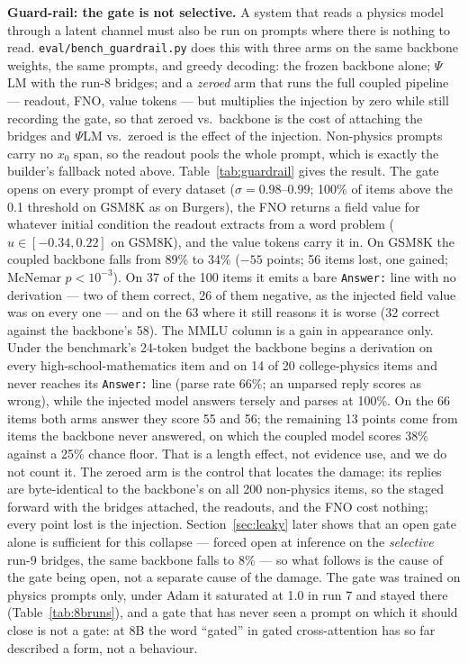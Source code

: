 \documentclass[11pt]{article}
\newcommand{\psilm}{$\Psi$LM}
\newcommand{\code}[1]{\texttt{#1}}
\begin{document}
\textbf{Guard-rail: the gate is not selective.} A system that reads a physics model through a latent channel must also be run on prompts where there is nothing to read. \code{eval/bench\_guardrail.py} does this with three arms on the same backbone weights, the same prompts, and greedy decoding: the frozen backbone alone; \psilm{} with the run-8 bridges; and a \emph{zeroed} arm that runs the full coupled pipeline --- readout, FNO, value tokens --- but multiplies the injection by zero while still recording the gate, so that zeroed vs.\ backbone is the cost of attaching the bridges and \psilm{} vs.\ zeroed is the effect of the injection. Non-physics prompts carry no $x_0$ span, so the readout pools the whole prompt, which is exactly the builder's fallback noted above. Table~\ref{tab:guardrail} gives the result. The gate opens on every prompt of every dataset ($\sigma=0.98$--$0.99$; 100\% of items above the 0.1 threshold on GSM8K as on Burgers), the FNO returns a field value for whatever initial condition the readout extracts from a word problem ($\hat u\in[-0.34,0.22]$ on GSM8K), and the value tokens carry it in. On GSM8K the coupled backbone falls from 89\% to 34\% ($-55$ points; 56 items lost, one gained; McNemar $p<10^{-3}$). On 37 of the 100 items it emits a bare \code{Answer:} line with no derivation --- two of them correct, 26 of them negative, as the injected field value was on every one --- and on the 63 where it still reasons it is worse (32 correct against the backbone's 58). The MMLU column is a gain in appearance only. Under the benchmark's 24-token budget the backbone begins a derivation on every high-school-mathematics item and on 14 of 20 college-physics items and never reaches its \code{Answer:} line (parse rate 66\%; an unparsed reply scores as wrong), while the injected model answers tersely and parses at 100\%. On the 66 items both arms answer they score 55 and 56; the remaining 13 points come from items the backbone never answered, on which the coupled model scores 38\% against a 25\% chance floor. That is a length effect, not evidence use, and we do not count it. The zeroed arm is the control that locates the damage: its replies are byte-identical to the backbone's on all 200 non-physics items, so the staged forward with the bridges attached, the readouts, and the FNO cost nothing; every point lost is the injection. Section~\ref{sec:leaky} later shows that an open gate alone is sufficient for this collapse --- forced open at inference on the \emph{selective} run-9 bridges, the same backbone falls to 8\% --- so what follows is the cause of the gate being open, not a separate cause of the damage. The gate was trained on physics prompts only, under Adam it saturated at 1.0 in run 7 and stayed there (Table~\ref{tab:8bruns}), and a gate that has never seen a prompt on which it should close is not a gate: at 8B the word ``gated'' in gated cross-attention has so far described a form, not a behaviour.
\end{document}
